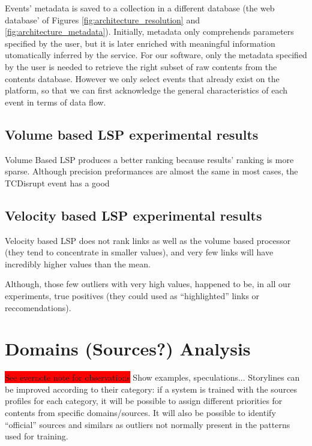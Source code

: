 \documentclass{sig-alternate}
\newcommand{\todo}[1]{\colorbox{red}{#1}}
\begin{document}
Events' metadata is saved to a collection in a different database (the web database' of Figures \ref{fig:architecture_resolution} and \ref{fig:architecture_metadata}). Initially, metadata only comprehends parameters specified by the user, but it is later enriched with meaningful information utomatically inferred by the service. For our software, only the metadata specified by the user is needed to retrieve the right subset of raw contents from the contents database. However we only select events that already exist on the platform, so that we can first acknowledge the general characteristics of each event in terms of data flow.

\subsection{Volume based LSP experimental results}
\label{sec:volumeResults}

Volume Based LSP produces a better ranking because results' ranking is more sparse. %
Although precision preformances are almost the same in most cases, the TCDisrupt event has a good

\subsection{Velocity based LSP experimental results}
\label{sec:velocityResults}

Velocity based LSP does not rank links as well as the volume based processor (they tend to concentrate in smaller values), and very few links will have incredibly higher values than the mean.

Although, those few outliers with very high values, happened to be, in all our experiments, true positives (they could used as ``highlighted'' links or reccomendations).


\section{Domains (Sources?) Analysis}
\label{sec:sources}
\todo{See evernote note for observations}
Show examples, speculations...
Storylines can be improved according to their category: if a system is trained with the sources profiles for each category, it will be possible to assign different priorities for contents from specific domains/sources. It will also be possible to identify ``official'' sources and similars as outliers not normally present in the patterns used for training.
\end{document}

